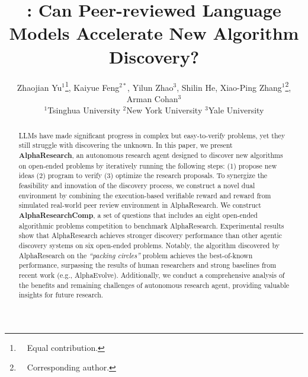 \documentclass{article} %
\title{\logo{}: Can Peer-reviewed Language Models Accelerate New Algorithm Discovery?}
\author{Zhaojian Yu$^{1}$\thanks{~~Equal contribution.},  
Kaiyue Feng$^{2*}$,  Yilun Zhao$^3$, Shilin He,  Xiao-Ping Zhang$^{1}$\thanks{~~Corresponding author.},  Arman Cohan$^3$
\\
$^1$Tsinghua University
$^2$New York University
$^3$Yale University
\\
[0.3em]
\makebox[\linewidth]{\href{https://github.com/answers111/alpha-research}{https://github.com/answers111/alpha-research}}
}
\newcommand{\dataset}{AlphaResearchComp\xspace}
\begin{document}
\ifcolmsubmission
\linenumbers
\fi

\maketitle
\vspace{-6pt}
\begin{abstract}
LLMs have made significant progress in complex but easy-to-verify problems, yet they still struggle with discovering the unknown.
In this paper, we present \textbf{AlphaResearch}, an autonomous research agent designed to discover new algorithms on open-ended problems by iteratively running the following steps: (1) propose new ideas (2) program to verify  (3) optimize the research proposals.
To synergize the feasibility and innovation of the discovery process, we construct a novel dual environment by combining the execution-based verifiable reward and reward from simulated real-world peer review environment in AlphaResearch.
We construct \textbf{\dataset}, a set of questions that includes an eight open-ended algorithmic problems competition to benchmark AlphaResearch.
Experimental results show that AlphaResearch achieves stronger discovery performance than other agentic discovery systems on six open-ended problems.
Notably, the algorithm discovered by AlphaResearch on the \emph{``packing circles''} problem achieves the best-of-known performance, surpassing the results of human researchers and strong baselines from recent work (e.g., AlphaEvolve). 
Additionally, we conduct a comprehensive analysis of the benefits and remaining challenges of autonomous research agent, providing valuable insights for future research.
\end{abstract}













\appendix
{}


% 
\end{document}
